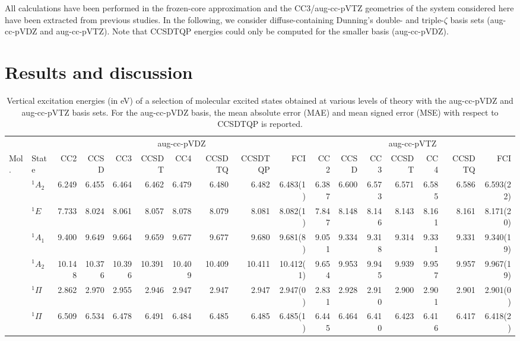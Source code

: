 \documentclass[aip,jcp,reprint,noshowkeys,superscriptaddress]{revtex4-1}
\newcommand{\mc}{\multicolumn}
\begin{document}
All calculations have been performed in the frozen-core approximation and the CC3/aug-cc-pVTZ geometries of the system considered here have been extracted from previous studies. \cite{Loos_2018a,Chrayteh_2021}
In the following, we consider diffuse-containing Dunning's double- and triple-$\zeta$ basis sets (aug-cc-pVDZ and aug-cc-pVTZ).
Note that CCSDTQP energies could only be computed for the smaller basis (aug-cc-pVDZ).

\section{Results and discussion}


\begin{squeezetable}
\begin{table}
	\caption{Vertical excitation energies (in eV) of a selection of molecular excited states obtained at various levels of theory with the aug-cc-pVDZ and aug-cc-pVTZ basis sets. 
	For the aug-cc-pVDZ basis, the mean absolute error (MAE) and mean signed error (MSE) with respect to CCSDTQP is reported.
	\label{tab:BigTab}}
	\begin{ruledtabular}
	\begin{tabular}{llrrrrrrrrrrrrrrr}
				&		&	\mc{8}{c}{aug-cc-pVDZ}		&		\mc{7}{c}{aug-cc-pVTZ}		\\	
				\cline{3-10} \cline{11-17}
	Mol.	&	State				&CC2	&CCSD	&CC3	&CCSDT	&CC4	&CCSDTQ	&CCSDTQP	&FCI	
									&CC2	&CCSD	&CC3	&CCSDT	&CC4	&CCSDTQ	&FCI			\\
	\hline
	\ce{NH3}	&	$^1A_2$ 		&6.249	&6.455	&6.464	&6.462	&6.479	&6.480	&6.482	&6.483(1)	&6.387	&6.600	&6.573	&6.571	&6.585	&6.586	&6.593(22)	\\	
				&	$^1E$			&7.733	&8.024	&8.061	&8.057	&8.078	&8.079	&8.081	&8.082(1)	&7.847	&8.148	&8.146	&8.143	&8.161	&8.161	&8.171(20)	\\	
				&	$^1A_1$ 		&9.400	&9.649	&9.664	&9.659	&9.677	&9.677	&9.680	&9.681(8)	&9.051	&9.334	&9.318	&9.314	&9.331	&9.331	&9.340(19)	\\
				&	$^1A_2$ 		&10.148	&10.376	&10.396	&10.391	&10.409	&10.409	&10.411	&10.412(1)	&9.654	&9.953	&9.945	&9.939	&9.957	&9.957	&9.967(19)	\\
	\ce{BH}		&	$^1\Pi$ 		&2.862	&2.970	&2.955	&2.946	&2.947	&2.947	&2.947	&2.947(0)	&2.831	&2.928	&2.910	&2.900	&2.901	&2.901	&2.901(0)	\\
	\ce{BF}		&	$^1\Pi$ 		&6.509	&6.534	&6.478	&6.491	&6.484	&6.485	&6.485	&6.485(1)	&6.445	&6.464	&6.410	&6.423	&6.416	&6.417	&6.418(2)\\

\end{tabular}
\end{ruledtabular}
\end{table}
\end{squeezetable}
\end{document}
